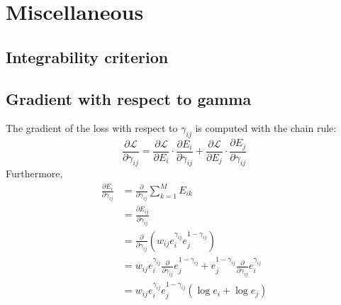 \chapter{Miscellaneous}\label{chapter-misc} 

\section{Integrability criterion}

\section{Gradient with respect to gamma}
The gradient of the loss with respect to $\gamma_{ij}$ is computed with the chain rule:
\begin{equation}
\frac{\partial \mathcal{L}}{\partial \gamma_{ij}} = \frac{\partial \mathcal{L}}{\partial E_i} \cdot \frac{\partial E_i}{\partial \gamma_{ij}} + \frac{\partial \mathcal{L}}{\partial E_j} \cdot \frac{\partial E_j}{\partial \gamma_{ij}} 
\end{equation}
Furthermore,
\begin{equation}
\begin{split}
\frac{\partial E_i}{\partial \gamma_{ij}} &= \frac{\partial}{\partial \gamma_{ij}} \sum_{k=1}^M E_{ik} \\
&= \frac{\partial E_{ij}}{\partial \gamma_{ij}} \\
&= \frac{\partial}{\partial \gamma_{ij}}(w_{ij}e_i^{\gamma_{ij}} e_j^{1-\gamma_{ij}})\\
&= w_{ij}e_i^{\gamma_{ij}}\frac{\partial}{\partial \gamma_{ij}}e_j^{1-\gamma_{ij}} + e_j^{1-\gamma_{ij}}\frac{\partial}{\partial \gamma_{ij}}e_i^{\gamma_{ij}}\\
&= w_{ij}e_i^{\gamma_{ij}}e_j^{1-\gamma_{ij}}(\log e_i + \log e_j)\\
\end{split}
\end{equation}




